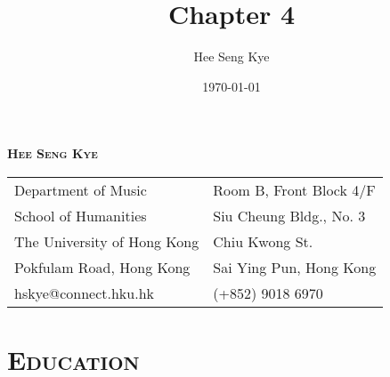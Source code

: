 \documentclass[letter,11pt,draft]{article}
\title{Chapter 4}
\author{Hee Seng Kye}
\date{\today}
\begin{document}
  \renewcommand{\headrulewidth}{0pt}
  \fancyhf{}
 
  \fancyfoot[RE,RO]{\small \thepage}
  
  \raggedright \parindent=15pt
  
  \begin{center}
    {\LARGE \textsc{\textbf{Hee Seng Kye}}}
  \end{center}
  
  \vspace{8mm}
  
  \hspace*{-0.8cm}
  \begin{tabular}{p{11.5cm} l}
    Department of Music & Room B, Front Block 4/F \\
    School of Humanities & Siu Cheung Bldg., No. 3 \\
    The University of Hong Kong & Chiu Kwong St.\\
    Pokfulam Road, Hong Kong & Sai Ying Pun, Hong Kong\\
    hskye@connect.hku.hk & (+852) 9018 6970
  \end{tabular}
  
  \vspace{5mm}
  
  \section*{\textsc{Education}}
  
\end{document}
